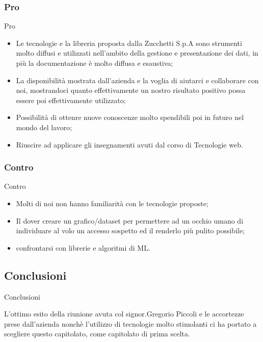 \documentclass[11pt]{article}
\begin{document}
        \subsubsection{Pro} Pro
        \begin{itemize}
            \item Le tecnologie e la libreria proposta dalla Zucchetti S.p.A sono strumenti molto diffusi e utilizzati nell'ambito della gestione e presentazione dei dati, in più la documentazione è molto diffusa e esaustiva;
            \item La disponibilità mostrata dall'azienda e la voglia di aiutarci e collaborare con noi, mostrandoci quanto effettivamente un nostro risultato positivo possa essere poi effettivamente utilizzato;
            \item Possibilità di ottenre nuove conoscenze molto spendibili poi in futuro nel mondo del lavoro;
            \item Riuscire ad applicare gli insegnamenti avuti dal corso di Tecnologie web.
        \end{itemize}
        \subsubsection{Contro} Contro
        \begin{itemize}
            \item Molti di noi non hanno familiarità con le tecnologie proposte;
            \item Il dover creare un grafico/dataset per permettere ad un occhio umano di individuare al volo un accesso sospetto ed il renderlo più pulito possibile;
            \item confrontarsi con librerie e algoritmi di ML.
        \end{itemize}
    
    \subsection{Conclusioni} Conclusioni
    
    L'ottimo esito della riunione avuta col signor.Gregorio Piccoli e le accortezze prese dall'azienda nonchè l'utilizzo di tecnologie molto stimolanti ci ha portato a scegliere questo capitolato, come capitolato di prima scelta.
    
\end{document}
